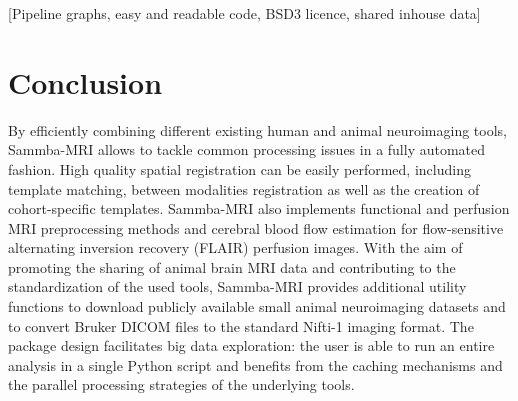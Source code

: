 \documentclass[utf8, a4paper, final, crop]{frontiersSCNS} %
\begin{document}
[Pipeline graphs, easy and readable code, BSD3 licence, shared inhouse data]

\section{Conclusion}

By efficiently combining different existing human and animal neuroimaging tools, Sammba-MRI
allows to tackle common processing issues in a fully automated fashion. High quality spatial
registration can be easily performed, including template matching, between modalities
registration as well as the creation of cohort-specific templates. Sammba-MRI also implements
functional and perfusion MRI preprocessing methods and cerebral blood flow estimation for
flow-sensitive alternating inversion recovery (FLAIR) perfusion images.
With the aim of promoting the sharing of animal brain MRI data and contributing to the
standardization of the used tools, Sammba-MRI provides additional utility functions to download
publicly available small animal neuroimaging datasets and to convert Bruker DICOM files to
the standard Nifti-1 imaging format.
The package design facilitates big data exploration: the user is able to run an entire analysis in
a single Python script and benefits from the caching mechanisms and the parallel processing
strategies of the underlying tools.
%
\end{document}
